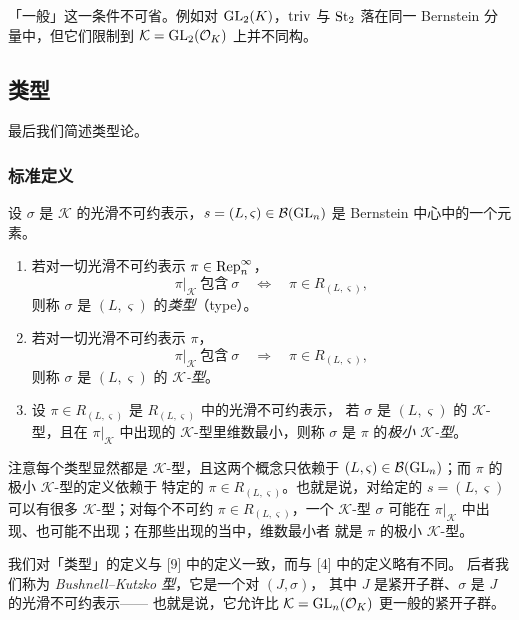 \begin{remark}
「一般」这一条件不可省。例如对 $\mathrm{GL}_2(K)$，$\mathrm{triv}$ 与 $\mathrm{St}_2$ 落在同一
Bernstein 分量中，但它们限制到 $\mathcal{K}=\mathrm{GL}_2(\mathcal{O}_K)$ 上并不同构。
\end{remark}

\subsection{类型}

最后我们简述类型论。

\subsubsection{标准定义}

\begin{definition}
设 $\sigma$ 是 $\mathcal{K}$ 的光滑不可约表示，$s=(L,\varsigma)\in\mathcal{B}(\mathrm{GL}_n)$
是 Bernstein 中心中的一个元素。
\begin{enumerate}[label=(\arabic*),leftmargin=2.2em]
\item 若对一切光滑不可约表示 $\pi\in\mathrm{Rep}^{\infty}_n$，
\[
\pi|_{\mathcal{K}}\ \text{包含}\ \sigma
\quad\Longleftrightarrow\quad
\pi\in R_{(L,\varsigma)},
\]
则称 $\sigma$ 是 $(L,\varsigma)$ 的\emph{类型}（type）。
\item 若对一切光滑不可约表示 $\pi$，
\[
\pi|_{\mathcal{K}}\ \text{包含}\ \sigma
\quad\Longrightarrow\quad
\pi\in R_{(L,\varsigma)},
\]
则称 $\sigma$ 是 $(L,\varsigma)$ 的 \emph{$\mathcal{K}$-型}。
\item 设 $\pi\in R_{(L,\varsigma)}$ 是 $R_{(L,\varsigma)}$ 中的光滑不可约表示，
      若 $\sigma$ 是 $(L,\varsigma)$ 的 $\mathcal{K}$-型，且在 $\pi|_{\mathcal{K}}$ 中出现的
      $\mathcal{K}$-型里维数最小，则称 $\sigma$ 是 $\pi$ 的\emph{极小 $\mathcal{K}$-型}。
\end{enumerate}
\end{definition}

注意每个类型显然都是 $\mathcal{K}$-型，且这两个概念只依赖于
$(L,\varsigma)\in\mathcal{B}(\mathrm{GL}_n)$；而 $\pi$ 的极小 $\mathcal{K}$-型的定义依赖于
特定的 $\pi\in R_{(L,\varsigma)}$。也就是说，对给定的 $s=(L,\varsigma)$ 可以有很多
$\mathcal{K}$-型；对每个不可约 $\pi\in R_{(L,\varsigma)}$，一个 $\mathcal{K}$-型 $\sigma$
可能在 $\pi|_{\mathcal{K}}$ 中出现、也可能不出现；在那些出现的当中，维数最小者
就是 $\pi$ 的极小 $\mathcal{K}$-型。

\begin{remark}
我们对「类型」的定义与 [9] 中的定义一致，而与 [4] 中的定义略有不同。
后者我们称为 \emph{Bushnell--Kutzko 型}，它是一个对 $(J,\sigma)$，
其中 $J$ 是紧开子群、$\sigma$ 是 $J$ 的光滑不可约表示——
也就是说，它允许比 $\mathcal{K}=\mathrm{GL}_n(\mathcal{O}_K)$ 更一般的紧开子群。
\end{remark}

